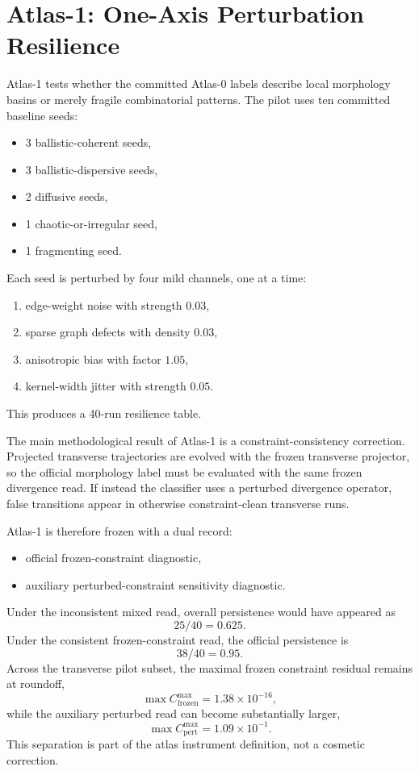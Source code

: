 \documentclass[11pt]{article}
\begin{document}
\section{Atlas-1: One-Axis Perturbation Resilience}
Atlas-1 tests whether the committed Atlas-0 labels describe local morphology basins or merely fragile combinatorial patterns. The pilot uses ten committed baseline seeds:
\begin{itemize}
\item 3 ballistic-coherent seeds,
\item 3 ballistic-dispersive seeds,
\item 2 diffusive seeds,
\item 1 chaotic-or-irregular seed,
\item 1 fragmenting seed.
\end{itemize}
Each seed is perturbed by four mild channels, one at a time:
\begin{enumerate}
\item edge-weight noise with strength $0.03$,
\item sparse graph defects with density $0.03$,
\item anisotropic bias with factor $1.05$,
\item kernel-width jitter with strength $0.05$.
\end{enumerate}
This produces a 40-run resilience table.

The main methodological result of Atlas-1 is a constraint-consistency correction. Projected transverse trajectories are evolved with the frozen transverse projector, so the official morphology label must be evaluated with the same frozen divergence read. If instead the classifier uses a perturbed divergence operator, false transitions appear in otherwise constraint-clean transverse runs.

Atlas-1 is therefore frozen with a dual record:
\begin{itemize}
\item official frozen-constraint diagnostic,
\item auxiliary perturbed-constraint sensitivity diagnostic.
\end{itemize}
Under the inconsistent mixed read, overall persistence would have appeared as
\begin{equation}
25/40 = 0.625.
\end{equation}
Under the consistent frozen-constraint read, the official persistence is
\begin{equation}
38/40 = 0.95.
\end{equation}
Across the transverse pilot subset, the maximal frozen constraint residual remains at roundoff,
\begin{equation}
\max C^{\max}_{\mathrm{frozen}} = 1.38 \times 10^{-16},
\end{equation}
while the auxiliary perturbed read can become substantially larger,
\begin{equation}
\max C^{\max}_{\mathrm{pert}} = 1.09 \times 10^{-1}.
\end{equation}
This separation is part of the atlas instrument definition, not a cosmetic correction.
\end{document}
